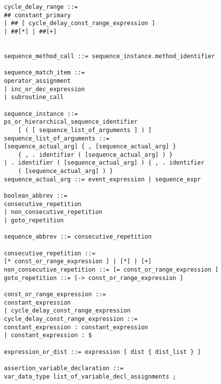 \documentclass[conference]{IEEEtran}
\begin{document}
\begin{lstlisting}
cycle_delay_range ::= 
## constant_primary
| ## [ cycle_delay_const_range_expression ]
| ##[*] | ##[+]


sequence_method_call ::= sequence_instance.method_identifier

sequence_match_item ::= 
operator_assignment
| inc_or_dec_expression 
| subroutine_call

sequence_instance ::=
ps_or_hierarchical_sequence_identifier 
	[ ( [ sequence_list_of_arguments ] ) ]
sequence_list_of_arguments ::=
[sequence_actual_arg] { , [sequence_actual_arg] } 
	{ , . identifier ( [sequence_actual_arg] ) }
| . identifier ( [sequence_actual_arg] ) { , . identifier 
	( [sequence_actual_arg] ) }
sequence_actual_arg ::= event_expression | sequence_expr

boolean_abbrev ::= 
consecutive_repetition
| non_consecutive_repetition 
| goto_repetition

sequence_abbrev ::= consecutive_repetition

consecutive_repetition ::= 
[* const_or_range_expression ] | [*] | [+]
non_consecutive_repetition ::= [= const_or_range_expression ]
goto_repetition ::= [-> const_or_range_expression ]

const_or_range_expression ::= 
constant_expression
| cycle_delay_const_range_expression
cycle_delay_const_range_expression ::=
constant_expression : constant_expression 
| constant_expression : $

expression_or_dist ::= expression [ dist { dist_list } ]

assertion_variable_declaration ::=
var_data_type list_of_variable_decl_assignments ;
\end{lstlisting}
\end{document}
